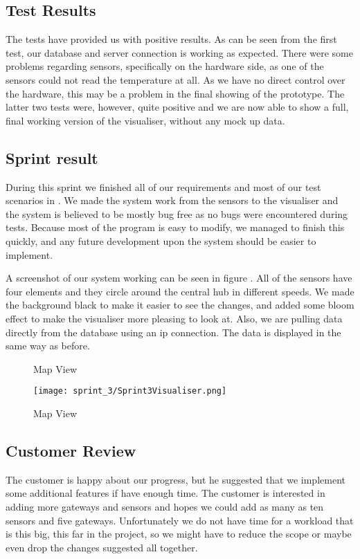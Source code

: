\documentclass[../document]{subfiles}
\begin{document}
\subsection{Test Results}
The tests have provided us with positive results. As can be seen from the first test, our database and server connection is working as expected. There were some problems regarding sensors, specifically on the hardware side, as one of the sensors could not read the temperature at all. As we have no direct control over the hardware, this may be a problem in the final showing of the prototype. The latter two tests were, however, quite positive and we are now able to show a full, final working version of the visualiser, without any mock up data.

\subsection{Sprint result}
During this sprint we finished all of our requirements  and most of our test scenarios in . We made the system work from the sensors to the visualiser and the system is believed to be mostly bug free as no bugs were encountered during tests. Because most of the program is easy to modify, we managed to finish this quickly, and any future development upon the system should be easier to implement.

A screenshot of our system working can be seen in figure . All of the sensors have four elements and they circle around the central hub in different speeds. We made the background black to make it easier to see the changes, and added some bloom effect to make the visualiser more pleasing to look at. Also, we are pulling data directly from the database using an ip connection. The data is displayed in the same way as before. 

\begin{figure}
	Map View

	\centering
	\texttt{[image: sprint\_3/Sprint3Visualiser.png]}
	\caption{Map View}
	\label{fig:map_view_3}
\end{figure}

\subsection{Customer Review}
The customer is happy about our progress, but he suggested that we implement some additional features if have enough time. The customer is interested in adding more gateways and sensors and hopes we could add as many as ten sensors and five gateways. Unfortunately we do not have time for a workload that is this big, this far in the project, so we might have to reduce the scope or maybe even drop the changes suggested all together.
\end{document}
